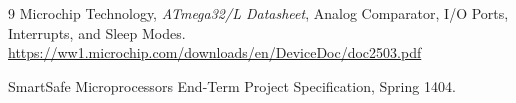\documentclass[11pt,a4paper]{article}
\begin{document}
\begin{thebibliography}{9}
Microchip Technology, \emph{ATmega32/L Datasheet}, Analog Comparator, I/O Ports, Interrupts, and Sleep Modes.\\
\url{https://ww1.microchip.com/downloads/en/DeviceDoc/doc2503.pdf}

SmartSafe Microprocessors End-Term Project Specification, Spring 1404.
\end{thebibliography}
\end{document}
